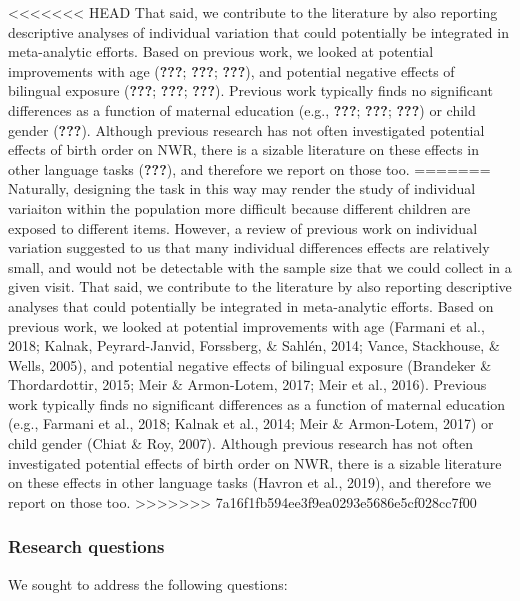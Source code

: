 \documentclass[english,,man,floatsintext]{apa6}
\begin{document}
<<<<<<< HEAD
That said, we contribute to the literature by also reporting descriptive analyses of individual variation that could potentially be integrated in meta-analytic efforts. Based on previous work, we looked at potential improvements with age ({\textbf{???}}; {\textbf{???}}; {\textbf{???}}), and potential negative effects of bilingual exposure ({\textbf{???}}; {\textbf{???}}; {\textbf{???}}). Previous work typically finds no significant differences as a function of maternal education (e.g., {\textbf{???}}; {\textbf{???}}; {\textbf{???}}) or child gender ({\textbf{???}}). Although previous research has not often investigated potential effects of birth order on NWR, there is a sizable literature on these effects in other language tasks ({\textbf{???}}), and therefore we report on those too.
=======
Naturally, designing the task in this way may render the study of individual variaiton within the population more difficult because different children are exposed to different items. However, a review of previous work on individual variation suggested to us that many individual differences effects are relatively small, and would not be detectable with the sample size that we could collect in a given visit. That said, we contribute to the literature by also reporting descriptive analyses that could potentially be integrated in meta-analytic efforts. Based on previous work, we looked at potential improvements with age (Farmani et al., 2018; Kalnak, Peyrard-Janvid, Forssberg, \& Sahlén, 2014; Vance, Stackhouse, \& Wells, 2005), and potential negative effects of bilingual exposure (Brandeker \& Thordardottir, 2015; Meir \& Armon-Lotem, 2017; Meir et al., 2016). Previous work typically finds no significant differences as a function of maternal education (e.g., Farmani et al., 2018; Kalnak et al., 2014; Meir \& Armon-Lotem, 2017) or child gender (Chiat \& Roy, 2007). Although previous research has not often investigated potential effects of birth order on NWR, there is a sizable literature on these effects in other language tasks (Havron et al., 2019), and therefore we report on those too.
>>>>>>> 7a16f1fb594ee3f9ea0293e5686e5cf028cc7f00

\hypertarget{research-questions}{%
\subsubsection{Research questions}\label{research-questions}}

We sought to address the following questions:
\end{document}
